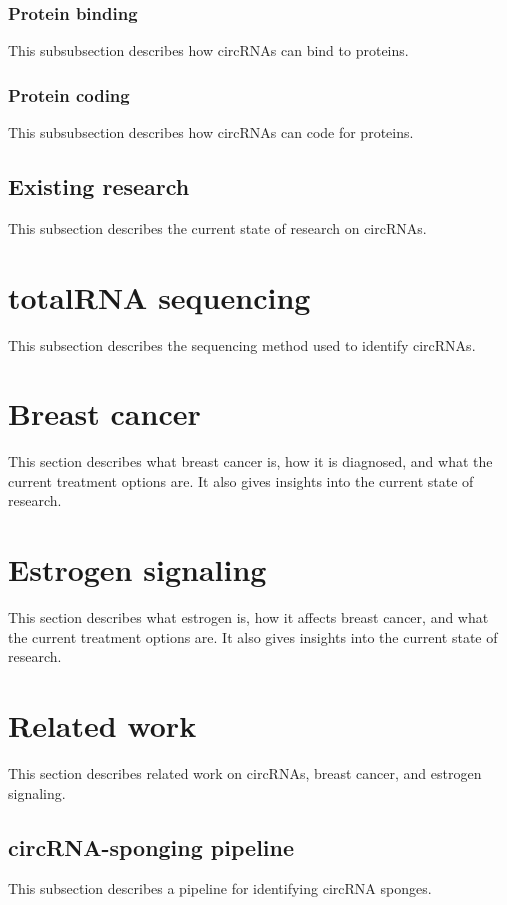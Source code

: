 \subsubsection{Protein binding}
This subsubsection describes how circRNAs can bind to proteins.

\subsubsection{Protein coding}
This subsubsection describes how circRNAs can code for proteins.

\subsection{Existing research}
This subsection describes the current state of research on circRNAs.

\section{totalRNA sequencing}
This subsection describes the sequencing method used to identify circRNAs.

\lipsum[2]

\section{Breast cancer}
This section describes what breast cancer is, how it is diagnosed, and what the current treatment options are.
It also gives insights into the current state of research.

\lipsum[3]

\section{Estrogen signaling}
This section describes what estrogen is, how it affects breast cancer, and what the current treatment options are.
It also gives insights into the current state of research.

\lipsum[4]

\section{Related work}
This section describes related work on circRNAs, breast cancer, and estrogen signaling.

\subsection{circRNA-sponging pipeline}
This subsection describes a pipeline for identifying circRNA sponges.